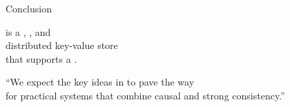 
\begin{frame}{Conclusion}
  \begin{center}
    \unistore{} is a , , and  \\[8pt]
     distributed key-value store \\[8pt]
    that supports a .

    \pause
    \vspace{0.80cm}
    ``We expect the key ideas in \unistore{} to pave the way \\[3pt]
    for practical systems that combine causal and strong consistency.''
  \end{center}
\end{frame}
